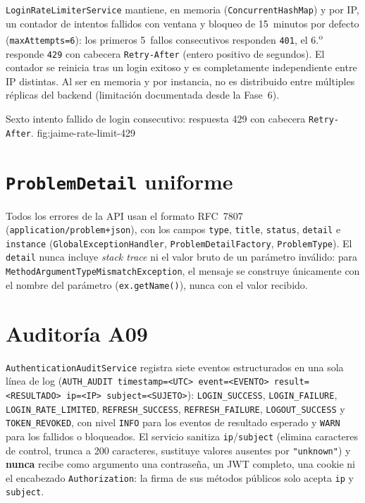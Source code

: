 \texttt{LoginRateLimiterService} mantiene, en memoria
(\texttt{ConcurrentHashMap}) y por IP, un contador de intentos fallidos con
ventana y bloqueo de 15~minutos por defecto (\texttt{maxAttempts=6}): los
primeros 5~fallos consecutivos responden \texttt{401}, el 6.\textsuperscript{o}
responde \texttt{429} con cabecera \texttt{Retry-After} (entero positivo de
segundos). El contador se reinicia tras un login exitoso y es
completamente independiente entre IP distintas. Al ser en memoria y por
instancia, no es distribuido entre m\'ultiples r\'eplicas del backend
(limitaci\'on documentada desde la Fase~6).

%
{Sexto intento fallido de login consecutivo: respuesta 429 con cabecera \texttt{Retry-After}.}%
{fig:jaime-rate-limit-429}

\section{\texttt{ProblemDetail} uniforme}

Todos los errores de la API usan el formato RFC~7807~\cite{rfc7807}
(\texttt{application/problem+json}), con los campos \texttt{type},
\texttt{title}, \texttt{status}, \texttt{detail} e \texttt{instance}
(\texttt{GlobalExceptionHandler}, \texttt{ProblemDetailFactory},
\texttt{ProblemType}). El \texttt{detail} nunca incluye \emph{stack trace}
ni el valor bruto de un par\'ametro inv\'alido: para
\texttt{MethodArgumentTypeMismatchException}, el mensaje se construye
\'unicamente con el nombre del par\'ametro (\texttt{ex.getName()}), nunca
con el valor recibido.

\section{Auditor\'ia A09}

\texttt{AuthenticationAuditService} registra siete eventos estructurados en
una sola l\'inea de log (\texttt{AUTH\_AUDIT
timestamp=<UTC> event=<EVENTO> result=<RESULTADO> ip=<IP> subject=<SUJETO>}):
\texttt{LOGIN_SUCCESS}, \texttt{LOGIN_FAILURE}, \texttt{LOGIN_RATE_LIMITED},
\texttt{REFRESH_SUCCESS}, \texttt{REFRESH_FAILURE}, \texttt{LOGOUT_SUCCESS}
y \texttt{TOKEN_REVOKED}, con nivel \texttt{INFO} para los eventos de
resultado esperado y \texttt{WARN} para los fallidos o bloqueados. El
servicio sanitiza \texttt{ip}/\texttt{subject} (elimina caracteres de
control, trunca a 200 caracteres, sustituye valores ausentes por
\texttt{"unknown"}) y \textbf{nunca} recibe como argumento una contrase\~na,
un JWT completo, una cookie ni el encabezado \texttt{Authorization}: la
firma de sus m\'etodos p\'ublicos solo acepta \texttt{ip} y \texttt{subject}.

